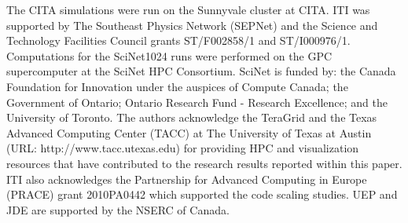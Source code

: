 \documentclass[useAMS,usenatbib]{mn2e}
\begin{document}
The CITA simulations were run on the Sunnyvale cluster at CITA.
ITI was supported by The Southeast Physics
Network (SEPNet) and the Science and Technology Facilities Council
grants ST/F002858/1 and ST/I000976/1. 
Computations for the SciNet1024 runs were performed on the GPC supercomputer at the SciNet HPC Consortium. SciNet is funded by: the Canada Foundation for Innovation under the auspices of Compute Canada; the Government of Ontario; Ontario Research Fund - Research Excellence; and the University of Toronto. 
The authors acknowledge the
TeraGrid and the Texas Advanced Computing Center (TACC) at The
University of Texas at Austin (URL: http://www.tacc.utexas.edu) for
providing HPC and visualization resources that have contributed to the
research results reported within this paper. ITI also acknowledges the Partnership for Advanced
Computing in Europe (PRACE) grant 2010PA0442 which supported the code
scaling studies. UEP and JDE are supported by the NSERC of Canada.






{}
%

\bsp

\label{lastpage}
\end{document}
